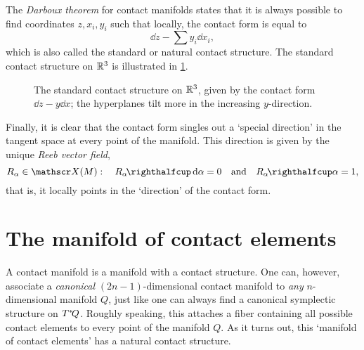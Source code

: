 The \emph{Darboux theorem} for contact manifolds states that it is always possible to find coordinates $z, x_i, y_i$ such that locally, the contact form is equal to 
$$ \dd{z} - \sum y_i\dd{x_i}, $$
which is also called the standard or natural contact structure. The standard contact structure on $\mathbb{R}^3$ is illustrated in \cref{fig:standard_contact}.
\begin{figure}
    \begin{center}
        
    \end{center}
    \caption{The standard contact structure on $\mathbb{R}^3$, given by the contact form $\dd{z} - y\dd{x}$; the hyperplanes tilt more in the increasing $y$-direction.}
    \label{fig:standard_contact}
\end{figure}
Finally, it is clear that the contact form singles out a `special direction' in the tangent space at every point of the manifold. This direction is given by the unique \emph{Reeb vector field},
$$ R_\alpha \in \vfields{M}:\quad \intpr{R_\alpha}{\dd{\alpha}}= 0 \quad \text{and} \quad \intpr{R_\alpha}{\alpha} = 1,$$
that is, it locally points in the `direction' of the contact form.

\section{The manifold of contact elements}
\label{ssec:mfd_contact_elements}
A contact manifold is a manifold with a contact structure. One can, however, associate a \emph{canonical} $(2n-1)$-dimensional contact manifold to \emph{any} $n$-dimensional manifold $Q$, just like one can always find a canonical symplectic structure on $T^*\!Q$. Roughly speaking, this attaches a fiber containing all possible contact elements to every point of the manifold $Q$. As it turns out, this `manifold of contact elements' has a natural contact structure.

